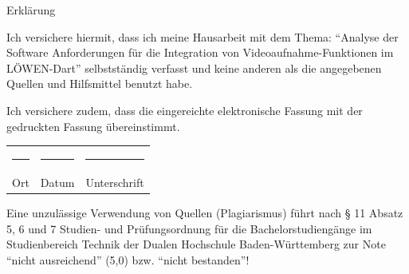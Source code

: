 \documentclass[a4paper,12pt,helvet]{article}
\begin{document}
\pagestyle{empty}

\begin{center}
    Erklärung
\end{center}

\vspace{1.5cm}

\noindent Ich versichere hiermit, dass ich meine Hausarbeit mit dem Thema: \enquote{Analyse der Software Anforderungen für die Integration von Videoaufnahme-Funktionen im LÖWEN-Dart} selbstständig verfasst und keine anderen als die angegebenen Quellen und Hilfsmittel benutzt habe.

\vspace{0.8cm}

\noindent Ich versichere zudem, dass die eingereichte elektronische Fassung mit der gedruckten Fassung übereinstimmt.

\vspace{3.5cm}

\noindent \begin{tabular}{@{}p{4cm}p{4cm}p{4cm}@{}}
    \rule{4cm}{0.4pt} & \rule{4cm}{0.4pt} & \rule{4cm}{0.4pt} \\
    Ort & Datum & Unterschrift
\end{tabular}

\vfill

\noindent Eine unzulässige Verwendung von Quellen (Plagiarismus) führt nach § 11 Absatz 5, 6 und 7 Studien- und Prüfungsordnung für die Bachelorstudiengänge im Studienbereich Technik der Dualen Hochschule Baden-Württemberg zur Note \enquote{nicht ausreichend} (5,0) bzw. \enquote{nicht bestanden}!
\end{document}
